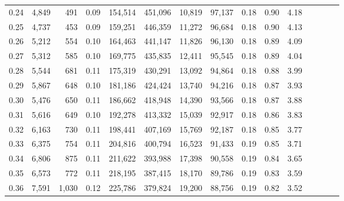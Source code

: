 \begin{tabular}{rrrcrrrrrrrrrrr}
0.24 &   4,849 &     491 &                                       0.09 &  154,514 &  451,096 &   10,819 &   97,137 &  0.18 &  0.90 &                         4.18 \\
0.25 &   4,737 &     453 &                                       0.09 &  159,251 &  446,359 &   11,272 &   96,684 &  0.18 &  0.90 &                         4.13 \\
0.26 &   5,212 &     554 &                                       0.10 &  164,463 &  441,147 &   11,826 &   96,130 &  0.18 &  0.89 &                         4.09 \\
0.27 &   5,312 &     585 &                                       0.10 &  169,775 &  435,835 &   12,411 &   95,545 &  0.18 &  0.89 &                         4.04 \\
0.28 &   5,544 &     681 &                                       0.11 &  175,319 &  430,291 &   13,092 &   94,864 &  0.18 &  0.88 &                         3.99 \\
0.29 &   5,867 &     648 &                                       0.10 &  181,186 &  424,424 &   13,740 &   94,216 &  0.18 &  0.87 &                         3.93 \\
0.30 &   5,476 &     650 &                                       0.11 &  186,662 &  418,948 &   14,390 &   93,566 &  0.18 &  0.87 &                         3.88 \\
0.31 &   5,616 &     649 &                                       0.10 &  192,278 &  413,332 &   15,039 &   92,917 &  0.18 &  0.86 &                         3.83 \\
0.32 &   6,163 &     730 &                                       0.11 &  198,441 &  407,169 &   15,769 &   92,187 &  0.18 &  0.85 &                         3.77 \\
0.33 &   6,375 &     754 &                                       0.11 &  204,816 &  400,794 &   16,523 &   91,433 &  0.19 &  0.85 &                         3.71 \\
0.34 &   6,806 &     875 &                                       0.11 &  211,622 &  393,988 &   17,398 &   90,558 &  0.19 &  0.84 &                         3.65 \\
0.35 &   6,573 &     772 &                                       0.11 &  218,195 &  387,415 &   18,170 &   89,786 &  0.19 &  0.83 &                         3.59 \\
0.36 &   7,591 &   1,030 &                                       0.12 &  225,786 &  379,824 &   19,200 &   88,756 &  0.19 &  0.82 &                         3.52 \\

\end{tabular}
